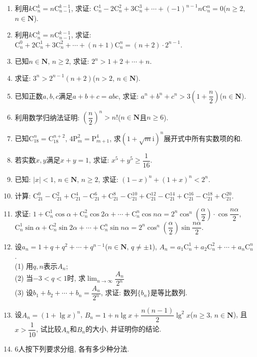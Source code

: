\documentclass[10pt,a4paper]{article}
\begin{document}
\begin{enumerate}[1.]
\item 利用$k\mathrm{C}_n^k=n\mathrm{C}_{n-1}^{k-1}$, 求证: $\mathrm{C}_n^1-2\mathrm{C}_n^2+3\mathrm{C}_n^3+\cdots +(-1)^{n-1}n\mathrm{C}_n^n=0$($n\ge 2$, $n\in \mathbf{N}$).
\item 利用$k\mathrm{C}_n^k=n\mathrm{C}_{n-1}^{k-1}$, 求证: $\mathrm{C}_n^0+2\mathrm{C}_n^1+3\mathrm{C}_n^2+\cdots +(n+1)\mathrm{C}_n^n=(n+2)\cdot 2^{n-1}$.
\item 已知$n\in \mathbf{N}$, $n\ge 2$, 求证: $2^n>1+2+\cdots +n$.
\item 求证: $3^n>2^{n-1}(n+2)$($n>2$, $n\in \mathbf{N}$).
\item 已知正数$a,b,c$满足$a+b+c=abc$, 求证: $a^n+b^n+c^n>3(1+\dfrac n2)$($n\in \mathbf{N}$).
\item 利用数学归纳法证明: $(\dfrac n2)^n>n!$($n\in \mathbf{N}$且$n\ge 6$).
\item 已知$\mathrm{C}_{18}^n=\mathrm{C}_{18}^{n+2}$, $4\mathrm{P}_m^2=\mathrm{P}_{m+1}^4$, 求$(1+\sqrt m\mathrm{i})^n$展开式中所有实数项的和.
\item 若实数$x,y$满足$x+y=1$, 求证: $x^5+y^5\ge \dfrac 1{16}$.
\item 已知: $|x|<1$, $n\in \mathbf{N}$, $n\ge 2$, 求证: $(1-x)^n+(1+x)^n<2^n$.
\item 计算: $\mathrm{C}_{21}^0-\mathrm{C}_{21}^2+\mathrm{C}_{21}^4-\mathrm{C}_{21}^6+\mathrm{C}_{21}^8-\mathrm{C}_{21}^{10}+\mathrm{C}_{21}^{12}-\mathrm{C}_{21}^{14}+\mathrm{C}_{21}^{16}-\mathrm{C}_{21}^{18}+\mathrm{C}_{21}^{20}$.
\item  求证: $1+\mathrm{C}_n^1\cos \alpha +\mathrm{C}_n^2\cos 2\alpha +\cdots +\mathrm{C}_n^n\cos n\alpha =2^n\cos ^n(\dfrac{\alpha }2)\cdot \cos \dfrac{n\alpha }2$,
$\mathrm{C}_n^1\sin \alpha +\mathrm{C}_n^2\sin 2\alpha +\cdots +\mathrm{C}_n^n\sin n\alpha =2^n\cos ^n(\dfrac{\alpha }2)\sin \dfrac{n\alpha }2$.
\item 设$a_n=1+q+q^2+\cdots +q^{n-1}$($n\in \mathbf{N}$, $q\ne \pm 1$), $A_n=a_1\mathrm{C}_n^1+a_2\mathrm{C}_n^2+\cdots +a_n\mathrm{C}_n^n$.\\
(1) 用$q,n$表示$A_n$;\\
(2) 当$-3<q<1$时, 求$\displaystyle\lim_{n\to\infty} \dfrac{A_n}{2^n}$\\
(3) 设$b_1+b_2+\cdots +b_n=\dfrac{A_n}{2^n}$, 求证: 数列$\{b_n\}$是等比数列.
\item 设$A_n=(1+\lg x)^n$, $B_n=1+n\lg x+\dfrac{n(n-1)}2\lg ^2x$($n\ge 3$, $n\in \mathbf{N}$), 且$x>\dfrac 1{10}$, 试比较$A_n$和$B_n$的大小, 并证明你的结论.
\item $6$人按下列要求分组, 各有多少种分法.\\

\end{enumerate}
\end{document}
